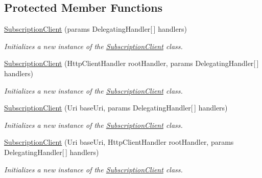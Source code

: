 \subsection*{Protected Member Functions}
\begin{DoxyCompactItemize}
\item 
\hyperlink{class_microsoft_1_1_azure_1_1_management_1_1_resources_1_1_subscription_client_a08db5fed47828d80a3d14c530265db2a}{Subscription\+Client} (params Delegating\+Handler\mbox{[}$\,$\mbox{]} handlers)
\begin{DoxyCompactList}\small\item\em Initializes a new instance of the \hyperlink{class_microsoft_1_1_azure_1_1_management_1_1_resources_1_1_subscription_client}{Subscription\+Client} class. \end{DoxyCompactList}\item 
\hyperlink{class_microsoft_1_1_azure_1_1_management_1_1_resources_1_1_subscription_client_a227244485e4b902762e11d9921aaf202}{Subscription\+Client} (Http\+Client\+Handler root\+Handler, params Delegating\+Handler\mbox{[}$\,$\mbox{]} handlers)
\begin{DoxyCompactList}\small\item\em Initializes a new instance of the \hyperlink{class_microsoft_1_1_azure_1_1_management_1_1_resources_1_1_subscription_client}{Subscription\+Client} class. \end{DoxyCompactList}\item 
\hyperlink{class_microsoft_1_1_azure_1_1_management_1_1_resources_1_1_subscription_client_a119ddb7996450a8b61f805524fe5095a}{Subscription\+Client} (Uri base\+Uri, params Delegating\+Handler\mbox{[}$\,$\mbox{]} handlers)
\begin{DoxyCompactList}\small\item\em Initializes a new instance of the \hyperlink{class_microsoft_1_1_azure_1_1_management_1_1_resources_1_1_subscription_client}{Subscription\+Client} class. \end{DoxyCompactList}\item 
\hyperlink{class_microsoft_1_1_azure_1_1_management_1_1_resources_1_1_subscription_client_a5d89239dcbe8b75331c0844572a874f5}{Subscription\+Client} (Uri base\+Uri, Http\+Client\+Handler root\+Handler, params Delegating\+Handler\mbox{[}$\,$\mbox{]} handlers)
\begin{DoxyCompactList}\small\item\em Initializes a new instance of the \hyperlink{class_microsoft_1_1_azure_1_1_management_1_1_resources_1_1_subscription_client}{Subscription\+Client} class. \end{DoxyCompactList}\end{DoxyCompactItemize}
